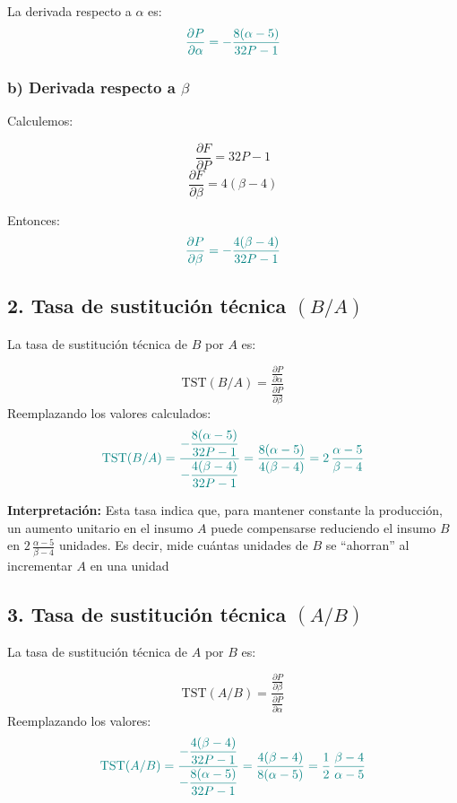 \documentclass{article}
\begin{document}
La derivada respecto a \(\alpha\) es:
\[
\color{teal}
\frac{\partial P}{\partial \alpha} = -\frac{8(\alpha-5)}{32P-1}
\]

\subsubsection*{b) Derivada respecto a \(\beta\)}

Calculemos:

\[
\frac{\partial F}{\partial P} = 32P-1
\]
\[
\frac{\partial F}{\partial \beta} = 4(\beta-4)
\]

Entonces:
\[
\color{teal}
\frac{\partial P}{\partial \beta} = -\frac{4(\beta-4)}{32P-1}
\]

\subsection*{2. Tasa de sustitución técnica \((B/A)\)}

La tasa de sustitución técnica de \(B\) por \(A\) es:

\[
\text{TST}(B/A) = \frac{\frac{\partial P}{\partial \alpha}}{\frac{\partial P}{\partial \beta}}
\]
Reemplazando los valores calculados:
\[
\color{teal}
\text{TST}(B/A) = \frac{-\dfrac{8(\alpha-5)}{32P-1}}{-\dfrac{4(\beta-4)}{32P-1}}
= \frac{8(\alpha-5)}{4(\beta-4)}
= 2\,\frac{\alpha-5}{\beta-4}
\]

\medskip

\textbf{Interpretación:} Esta tasa indica que, para mantener constante la producción, un aumento unitario en el insumo \(A\) puede compensarse reduciendo el insumo \(B\) en \(2\,\frac{\alpha-5}{\beta-4}\) unidades. Es decir, mide cuántas unidades de \(B\) se “ahorran” al incrementar \(A\) en una unidad

\bigskip

\subsection*{3. Tasa de sustitución técnica \((A/B)\)}

La tasa de sustitución técnica de \(A\) por \(B\) es:

\[
\text{TST}(A/B) = \frac{\frac{\partial P}{\partial \beta}}{\frac{\partial P}{\partial \alpha}}
\]
Reemplazando los valores:
\[
\color{teal}
\text{TST}(A/B) = \frac{-\dfrac{4(\beta-4)}{32P-1}}{-\dfrac{8(\alpha-5)}{32P-1}}
= \frac{4(\beta-4)}{8(\alpha-5)}
= \frac{1}{2}\,\frac{\beta-4}{\alpha-5}
\]

\medskip
\end{document}
